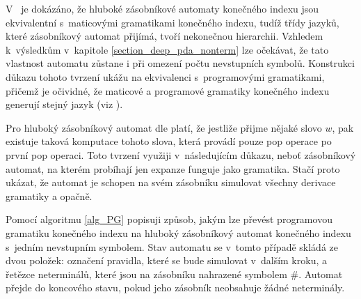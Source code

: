 
V~\cite{Meduna:FinitelyDeepPDA} je dokázáno, že hluboké zásobníkové automaty konečného indexu jsou ekvivalentní s~maticovými gramatikami konečného indexu, tudíž třídy jazyků, které zásobníkový automat přijímá, tvoří nekonečnou hierarchii. Vzhledem k~výsledkům v~kapitole \ref{section_deep_pda_nonterm} lze očekávat, že tato vlastnost automatu zůstane i při omezení počtu nevstupních symbolů. Konstrukci důkazu tohoto tvrzení ukážu na ekvivalenci s~programovými gramatikami, přičemž je očividné, že maticové a programové gramatiky konečného indexu generují stejný jazyk (viz \cite{Dassow:RegulatedRewriting}).

Pro hluboký zásobníkový automat dle \cite{Meduna:FinitelyDeepPDA} platí, že jestliže přijme nějaké slovo $w$, pak existuje taková komputace tohoto slova, která provádí pouze pop operace po první pop operaci. Toto tvrzení využiji v~následujícím důkazu, neboť zásobníkový automat, na kterém probíhají jen expanze funguje jako gramatika. Stačí proto ukázat, že automat je schopen na svém zásobníku simulovat všechny derivace gramatiky a opačně.

Pomocí algoritmu \ref{alg_PG} popisuji způsob, jakým lze převést programovou gramatiku konečného indexu na hluboký zásobníkový automat konečného indexu s~jedním nevstupním symbolem. Stav automatu se v~tomto případě skládá ze dvou položek: označení pravidla, které se bude simulovat v~dalším kroku, a řetězce neterminálů, které jsou na zásobníku nahrazené symbolem $\#$. Automat přejde do koncového stavu, pokud jeho zásobník neobsahuje žádné neterminály.

